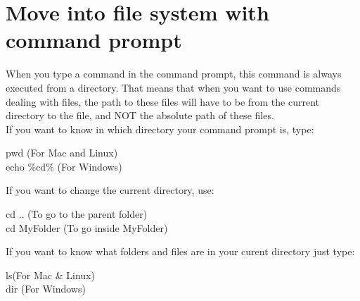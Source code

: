\documentclass[10pt,letterpaper]{article}
\begin{document}
\section {Move into file system with command prompt}
When you type a command in the command prompt, this command is always executed from a directory. That means that when you want to use commands dealing with files, the path to these files will have to be from the current directory to the file, and NOT the absolute path of these files.\\
If you want to know in which directory your command prompt is, type:
\begin{mdframed}[backgroundcolor=black, fontcolor=white]
pwd \hfill(For Mac and Linux)\\
echo \%cd\% \hfill(For Windows)
\end{mdframed}
If you want to change the current directory, use:
\begin{mdframed}[backgroundcolor=black, fontcolor=white]
cd .. \hfill(To go to the parent folder)\\
cd MyFolder \hfill(To go inside MyFolder)
\end{mdframed}
If you want to know what folders and files are in your curent directory just type:\\
\begin{mdframed}[backgroundcolor=black, fontcolor=white]
ls\hfill(For Mac \& Linux)\\
dir \hfill(For Windows)
\end{mdframed}
\end{document}
